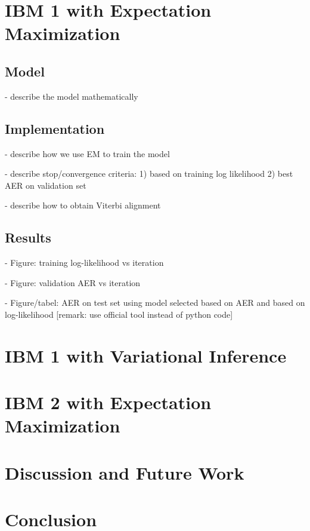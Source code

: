\documentclass[11pt,a4paper]{article}
\begin{document}
\section{IBM 1 with Expectation Maximization}
\label{IBM1}

\subsection{Model}
- describe the model mathematically

\subsection{Implementation}
- describe how we use EM to train the model

- describe stop/convergence criteria:
1) based on training log likelihood
2) best AER on validation set

- describe how to obtain Viterbi alignment

\subsection{Results}

- Figure: training log-likelihood vs iteration

- Figure: validation AER vs iteration

- Figure/tabel: AER on test set using model selected based on AER and based on log-likelihood [remark: use official tool instead of python code]  

\section{IBM 1 with Variational Inference}
\label{IBM1_Dirichlet}

\section{IBM 2 with Expectation Maximization}
\label{IBM2}

\section{Discussion and Future Work}

\section{Conclusion}
\end{document}
